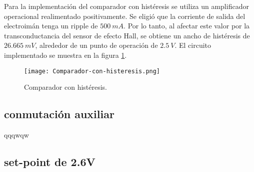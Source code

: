 Para la implementación del comparador con histéresis se utiliza un amplificador operacional realimentado positivamente. Se eligió que la corriente de salida del electroimán tenga un ripple de $500\:mA$. Por lo tanto, al afectar este valor por la transconductancia del sensor de efecto Hall, se obtiene un ancho de histéresis de $26.665\:mV$, alrededor de un punto de operación de $2.5\:V$. El circuito implementado se muestra en la figura \ref{fig:img_comp-con-hist}.

\begin{figure}[H]
	\centering
	\texttt{[image: Comparador-con-histeresis.png]}
	\caption{Comparador con histéresis.}
	\label{fig:img_comp-con-hist}
\end{figure}

\subsection{conmutación auxiliar}
qqqwqw
\subsection{set-point de 2.6V}
 